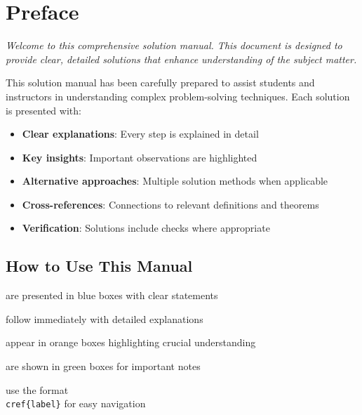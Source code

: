 \documentclass[11pt, oneside, openany]{book}
\theoremstyle{definition}
\begin{document}
\chapter*{Preface}

\begin{tcolorbox}[
    enhanced,
    colback=lightgray,
    colframe=darkgray,
    boxrule=0.5pt,
    arc=2pt,
    left=4mm,
    right=4mm,
    top=3mm,
    bottom=3mm
]
\textit{Welcome to this comprehensive solution manual. This document is designed 
to provide clear, detailed solutions that enhance understanding of the subject matter.}
\end{tcolorbox}

This solution manual has been carefully prepared to assist students and instructors 
in understanding complex problem-solving techniques. Each solution is presented with:

\begin{itemize}[leftmargin=1.5cm, itemsep=0.3cm]
    \item \textbf{Clear explanations}: Every step is explained in detail
    \item \textbf{Key insights}: Important observations are highlighted
    \item \textbf{Alternative approaches}: Multiple solution methods when applicable
    \item \textbf{Cross-references}: Connections to relevant definitions and theorems
    \item \textbf{Verification}: Solutions include checks where appropriate
\end{itemize}

\section*{How to Use This Manual}

\begin{description}[leftmargin=2cm, itemsep=0.5cm]
    \item[\textbf{Problems}] are presented in blue boxes with clear statements
    \item[\textbf{Solutions}] follow immediately with detailed explanations
    \item[\textbf{Key Insights}] appear in orange boxes highlighting crucial understanding
    \item[\textbf{Key Observations}] are shown in green boxes for important notes
    \item[\textbf{Cross-references}] use the format \texttt{\\cref\{label\}} for easy navigation
\end{description}
\end{document}
